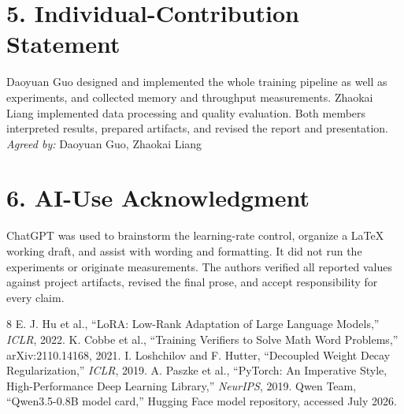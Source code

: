 \documentclass[10pt]{article}
\begin{document}
\section*{5. Individual-Contribution Statement}

Daoyuan Guo designed and implemented the whole training pipeline as well as experiments, and collected memory and throughput measurements. Zhaokai Liang implemented data processing and quality evaluation. Both members interpreted results, prepared artifacts, and revised the report and presentation.\\[-1mm]

\textit{Agreed by:} Daoyuan Guo, Zhaokai Liang

\section*{6. AI-Use Acknowledgment}

ChatGPT was used to brainstorm the learning-rate control, organize a LaTeX working draft, and assist with wording and formatting. It did not run the experiments or originate measurements. The authors verified all reported values against project artifacts, revised the final prose, and accept responsibility for every claim.

\begin{center}
\end{center}

\begin{thebibliography}{8}\footnotesize
{} E. J. Hu et al., ``LoRA: Low-Rank Adaptation of Large Language Models,'' \emph{ICLR}, 2022.
 K. Cobbe et al., ``Training Verifiers to Solve Math Word Problems,'' arXiv:2110.14168, 2021.
 I. Loshchilov and F. Hutter, ``Decoupled Weight Decay Regularization,'' \emph{ICLR}, 2019.
 A. Paszke et al., ``PyTorch: An Imperative Style, High-Performance Deep Learning Library,'' \emph{NeurIPS}, 2019.
 Qwen Team, ``Qwen3.5-0.8B model card,'' Hugging Face model repository, accessed July 2026.
\end{thebibliography}
\end{document}
